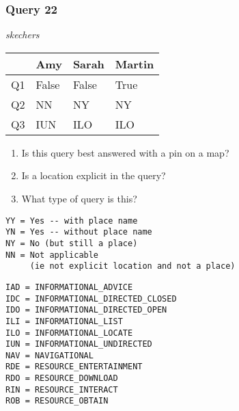 \begin{frame}[fragile]
\frametitle{Query 22}
\vspace{1em}

\emph{skechers}

\vfill

\begin{table}
  \centering
  \begin{tabular}{ l l l l }
    & \textbf{Amy} & \textbf{Sarah} & \textbf{Martin}\\
    \toprule
    Q1 & False & False & True\\
Q2 & NN & NY & NY\\
Q3 & IUN & ILO & ILO\\
    \bottomrule
  \end{tabular}
\end{table}

\vfill

\tiny{

\begin{enumerate}
\item Is this query best answered with a pin on a map?
\item Is a location explicit in the query?
\item What type of query is this?
\end{enumerate}

\vfill

\begin{multicols}{2}
\begin{verbatim}
YY = Yes -- with place name
YN = Yes -- without place name
NY = No (but still a place)
NN = Not applicable 
     (ie not explicit location and not a place)
\end{verbatim}

\columnbreak
\begin{verbatim}
IAD = INFORMATIONAL_ADVICE
IDC = INFORMATIONAL_DIRECTED_CLOSED
IDO = INFORMATIONAL_DIRECTED_OPEN
ILI = INFORMATIONAL_LIST
ILO = INFORMATIONAL_LOCATE
IUN = INFORMATIONAL_UNDIRECTED
NAV = NAVIGATIONAL
RDE = RESOURCE_ENTERTAINMENT
RDO = RESOURCE_DOWNLOAD
RIN = RESOURCE_INTERACT
ROB = RESOURCE_OBTAIN
\end{verbatim}
\end{multicols}
}

\end{frame}


